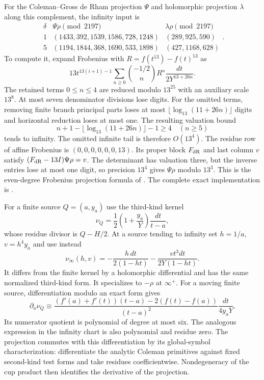 For the Coleman--Gross de Rham projection $\Psi$ and holomorphic
projection $\lambda$ along this complement, the infinity input is
\[
\begin{array}{c|c|c}
\delta&\Psi\rho\pmod{2197}&\lambda\rho\pmod{2197}\\ \hline
1&(1433,392,1539,1586,728,1248)&(289,925,590)\\
5&(1194,1844,368,1690,533,1898)&(427,1168,628)
\end{array}.
\]
To compute it, expand Frobenius with
$R=f(t^{13})-f(t)^{13}$ as
\[
 13t^{13(i+1)-1}\sum_{n\geq0}\binom{-1/2}{n}
           R^n\frac{dt}{2Y^{13+26n}}.
\]
The retained terms $0\leq n\leq4$ are reduced modulo $13^{25}$ with
an auxiliary scale $13^8$. At most seven denominator divisions lose
digits. For the omitted terms, removing finite branch principal parts
loses at most $\lfloor\log_{13}(11+26n)\rfloor$ digits and horizontal
reduction loses at most one. The resulting valuation bound
\[
 n+1-\lfloor\log_{13}(11+26n)\rfloor-1\geq4\quad(n\geq5)
\]
tends to infinity. The omitted infinite tail is therefore
$O(13^4)$. The residue row of affine Frobenius is
$(0,0,0,0,0,0,13)$. Its proper block $F_{\rm dR}$ and last column $v$
satisfy $(F_{\rm dR}-13I)\Psi\rho=v$. The determinant has valuation
three, but the inverse entries lose at most one digit, so precision
$13^4$ gives $\Psi\rho$ modulo $13^3$. This is the even-degree
Frobenius projection formula of \cite[Proposition~5.3]{GajovicMuller}. The complete exact implementation is
.

For a finite source $Q=(a,y_a)$ use the third-kind kernel
\[
 \nu_Q=\frac12\left(1+\frac{y_a}{Y}\right)\frac{dt}{t-a},
\]
whose residue divisor is $Q-H/2$. At a source tending to infinity set
$h=1/a$, $v=h^4y_a$ and use instead
\[
 \nu_\infty(h,v)=-\frac{h\,dt}{2(1-ht)}
                       -\frac{v t^3dt}{2Y(1-ht)}.
\]
It differs from the finite kernel by a holomorphic differential and
has the same normalized third-kind form. It specializes to
$-\rho$ at $\infty^+$.
For a moving finite source, differentiation modulo an exact form gives
\[
 \partial_a\nu_Q\equiv
 \frac{(f'(a)+f'(t))(t-a)-2(f(t)-f(a))}{(t-a)^2}
                       \frac{dt}{4y_aY}.
\]
Its numerator quotient is polynomial of degree at most six. The
analogous expression in the infinity chart is also polynomial and
residue zero. The projection commutes with this differentiation by
its global-symbol characterization: differentiate the analytic
Coleman primitives against fixed second-kind test forms and take
residues coefficientwise. Nondegeneracy of the cup product then
identifies the derivative of the projection.

